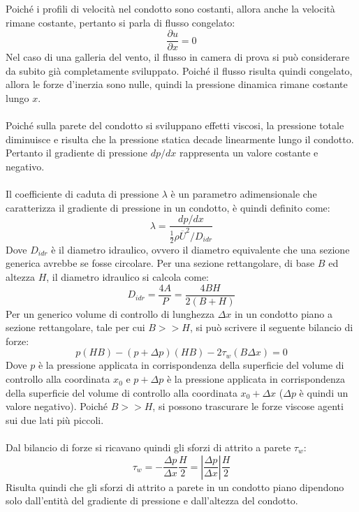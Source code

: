 \noindent Poiché i profili di velocità nel condotto sono costanti, allora anche la velocità rimane costante, pertanto si parla di flusso congelato:
\begin{equation*}
    \frac{\partial u}{\partial x} = 0
\end{equation*}
Nel caso di una galleria del vento, il flusso in camera di prova si può considerare da subito già completamente sviluppato. Poiché il flusso risulta quindi congelato, allora le forze d'inerzia sono nulle, quindi la pressione dinamica rimane costante lungo $x$.\\\\
Poiché sulla parete del condotto si sviluppano effetti viscosi, la pressione totale diminuisce e risulta che la pressione statica decade linearmente lungo il condotto. Pertanto il gradiente di pressione $dp/dx$ rappresenta un valore costante e negativo.\\\\
Il coefficiente di caduta di pressione $\lambda$ è un parametro adimensionale che caratterizza il gradiente di pressione in un condotto, è quindi definito come:
\begin{equation*}
    \lambda = \frac{dp/dx}{\frac12 \rho \overline U^2 / D_{idr}}
\end{equation*}
Dove $D_{idr}$ è il diametro idraulico, ovvero il diametro equivalente che una sezione generica avrebbe se fosse circolare. Per una sezione rettangolare, di base $B$ ed altezza $H$, il diametro idraulico si calcola come:
\begin{equation*}
    D_{idr} = \frac{4A}{P} = \frac{4BH}{2(B+H)}
\end{equation*}
Per un generico volume di controllo di lunghezza $\Delta x$ in un condotto piano a sezione rettangolare, tale per cui $B>>H$, si può scrivere il seguente bilancio di forze:
\begin{equation*}
    p(HB) - (p+\Delta p)(HB) - 2\tau_w (B\Delta x) = 0
\end{equation*}
Dove $p$ è la pressione applicata in corrispondenza della superficie del volume di controllo alla coordinata $x_0$ e $p+\Delta p$ è la pressione applicata in corrispondenza della superficie del volume di controllo alla coordinata $x_0+\Delta x$ ($\Delta p$ è quindi un valore negativo). Poiché $B>>H$, si possono trascurare le forze viscose agenti sui due lati più piccoli.\\\\
Dal bilancio di forze si ricavano quindi gli sforzi di attrito a parete $\tau_w$:
\begin{equation*}
    \tau_w = -\frac{\Delta p}{\Delta x} \frac H2 = \left| \frac{\Delta p}{\Delta x} \right| \frac H2
\end{equation*}
Risulta quindi che gli sforzi di attrito a parete in un condotto piano dipendono solo dall'entità del gradiente di pressione e dall'altezza del condotto.

